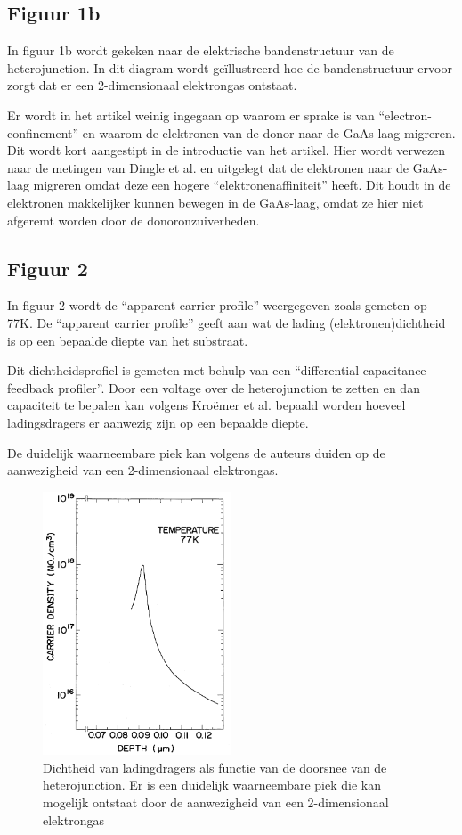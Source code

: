 \documentclass[11pt]{article}
\begin{document}
\subsection{Figuur 1b}
In figuur 1b wordt gekeken naar de elektrische bandenstructuur van de heterojunction. In dit diagram wordt ge\"illustreerd hoe de bandenstructuur ervoor zorgt dat er een 2-dimensionaal elektrongas ontstaat. 

Er wordt in het artikel weinig ingegaan op waarom er sprake is van ``electron-confinement'' en waarom de elektronen van de donor naar de GaAs-laag migreren. Dit wordt kort aangestipt in de introductie van het artikel. Hier wordt verwezen naar de metingen van Dingle et al. en uitgelegt dat de elektronen naar de GaAs-laag migreren omdat deze een hogere ``elektronenaffiniteit'' heeft. Dit houdt in de elektronen makkelijker kunnen bewegen in de GaAs-laag, omdat ze hier niet afgeremt worden door de donoronzuiverheden.

\subsection{Figuur 2}
In figuur 2 wordt de ``apparent carrier profile'' weergegeven zoals gemeten op 77K. De ``apparent carrier profile'' geeft aan wat de lading (elektronen)dichtheid is op een bepaalde diepte van het substraat.

Dit dichtheidsprofiel is gemeten met behulp van een ``differential capacitance feedback profiler''. Door een voltage over de heterojunction te zetten en dan capaciteit te bepalen kan volgens Kro\"emer et al. bepaald worden hoeveel ladingsdragers er aanwezig zijn op een bepaalde diepte.

De duidelijk waarneembare piek kan volgens de auteurs duiden op de aanwezigheid van een 2-dimensionaal elektrongas.

\begin{figure}[h]
  \begin{center}
\includegraphics[width=0.5\textwidth]{carrier_profile_depth.png}
\caption{Dichtheid van ladingdragers als functie van de doorsnee van de heterojunction. Er is een duidelijk waarneembare piek die kan mogelijk ontstaat door de aanwezigheid van een 2-dimensionaal elektrongas}
\label{fig:carrierprofile}
  \end{center}
\end{figure}
\end{document}
